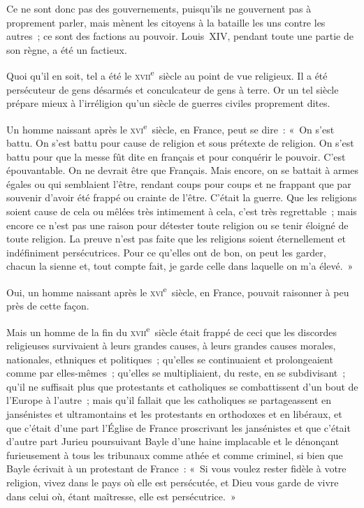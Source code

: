 \documentclass[french,twoside]{book} %
\begin{document}
Ce ne sont donc pas des gouvernements, puisqu’ils ne gouvernent pas à proprement parler, mais mènent les citoyens à la bataille les uns  contre les autres ; ce sont des factions au pouvoir. Louis XIV, pendant toute une partie de son règne, a été un factieux.\par
Quoi qu’il en soit, tel a été le \textsc{xvii}\textsuperscript{e} siècle au point de vue religieux. Il a été persécuteur de gens désarmés et conculcateur de gens à terre. Or un tel siècle prépare mieux à l’irréligion qu’un siècle de guerres civiles proprement dites.\par
Un homme naissant après le \textsc{xvi}\textsuperscript{e} siècle, en France, peut se dire : « On s’est battu. On s’est battu pour cause de religion et sous prétexte de religion. On s’est battu pour que la messe fût dite en français et pour conquérir le pouvoir. C’est épouvantable. On ne devrait être que Français. Mais encore, on se battait à armes égales ou qui semblaient l’être, rendant coups pour coups et ne frappant que par souvenir d’avoir été frappé ou crainte de l’être. C’était la guerre. Que les religions soient cause de cela ou mêlées très intimement à cela, c’est très regrettable ; mais encore ce n’est pas une raison pour détester toute religion ou se tenir éloigné de toute religion. La preuve n’est pas faite que les religions soient éternellement et indéfiniment persécutrices. Pour ce qu’elles ont de bon, on peut les garder, chacun la sienne et, tout compte fait, je garde celle dans laquelle on m’a élevé. »\par
 Oui, un homme naissant après le \textsc{xvi}\textsuperscript{e} siècle, en France, pouvait raisonner à peu près de cette façon.\par
Mais un homme de la fin du \textsc{xvii}\textsuperscript{e} siècle était frappé de ceci que les discordes religieuses survivaient à leurs grandes causes, à leurs grandes causes morales, nationales, ethniques et politiques ; qu’elles se continuaient et prolongeaient comme par elles-mêmes ; qu’elles se multipliaient, du reste, en se subdivisant ; qu’il ne suffisait plus que protestants et catholiques se combattissent d’un bout de l’Europe à l’autre ; mais qu’il fallait que les catholiques se partageassent en jansénistes et ultramontains et les protestants en orthodoxes et en libéraux, et que c’était d’une part l’Église de France proscrivant les jansénistes et que c’était d’autre part Jurieu poursuivant Bayle d’une haine implacable et le dénonçant furieusement à tous les tribunaux comme athée et comme criminel, si bien que Bayle écrivait à un protestant de France : « Si vous voulez rester fidèle à votre religion, vivez dans le pays où elle est persécutée, et Dieu vous garde de vivre dans celui où, étant maîtresse, elle est persécutrice. »\par
\end{document}
